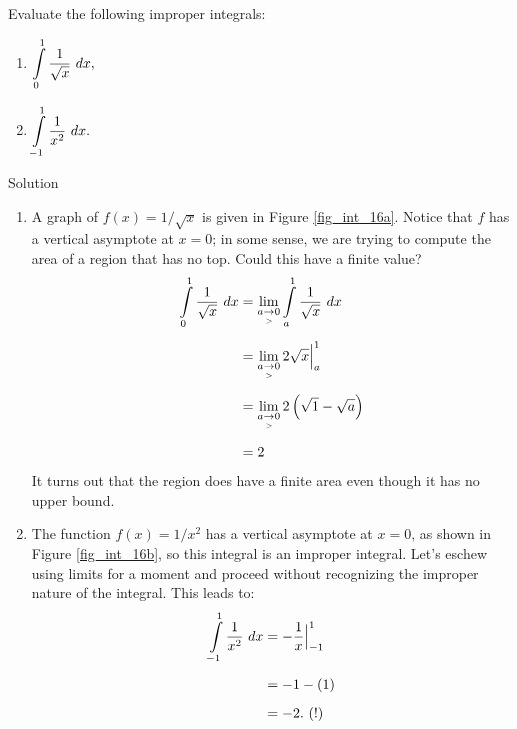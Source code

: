 \begin{example}\label{ex_impint3}
Evaluate the following improper integrals:
\begin{multicols}{2}
\begin{enumerate}
    \item $\ds \int\limits_0^1\frac1{\sqrt{x}}\ dx, $
    \item $\ds \int\limits_{-1}^1\frac{1}{x^2}\ dx. $
\end{enumerate}
\end{multicols}


Solution 


\begin{enumerate}
\item		A graph of $f(x) = 1/\sqrt{x}$ is given in Figure \ref{fig_int_16a}. Notice that $f$ has a vertical asymptote at $x=0$; in some sense, we are trying to compute the area of a region that has no top. Could this have a finite value? 
\begin{align*} \displaystyle \int\limits_0^1 \frac{1}{\sqrt{x}}\ dx &= \lim_{a\underset{>}{\rightarrow}0}\displaystyle \int\limits_a^1 \frac1{\sqrt{x}}\ dx \\[0.2cm]
			&=	\lim_{a\underset{>}{\rightarrow}0} 2\sqrt{x}\Big|_a^1 \\[0.2cm]
			&= \lim_{a\underset{>}{\rightarrow}0} 2\left(\sqrt{1}-\sqrt{a}\right)\\[0.2cm]
			&=	2
\end{align*}
It turns out that the region does have a finite area even though it has no upper bound.


\item		The function $f(x) = 1/x^2$ has a vertical asymptote at $x=0$, as shown in Figure \ref{fig_int_16b}, so this integral is an improper integral. Let's eschew using limits for a moment and proceed without recognizing the improper nature of the integral. This leads to:
\begin{align*}
\displaystyle \int\limits_{-1}^1\frac1{x^2}\ dx &= -\frac1x\Big|_{-1}^1\\[0.2cm]
			&= -1 - (1)\\[0.2cm]
			&=-2. \ (!)
\end{align*}


\end{enumerate}
\end{example}
